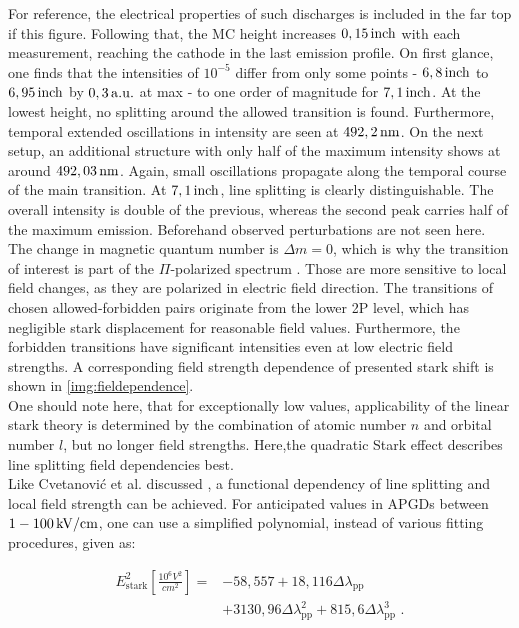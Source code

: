 \documentclass[a4paper,10pt,twoside]{article}
\newcommand{\tenpo}[1]{ 10^{#1}}
\newcommand{\ix}[1]{_\text{#1}}
\begin{document}
		For reference, the electrical properties of such discharges is included in the far top if this figure. Following that, the MC height increases $\unit[0,15]{inch}$ with each measurement, reaching the cathode in the last emission profile. On first glance, one finds that the intensities of $\tenpo{-5}$ differ from only some points - $\unit[6,8]{inch}$ to $\unit[6,95]{inch}$ by $\unit[0,3]{a.u.}$ at max - to one order of magnitude for $\unit[7,1]{inch}$. At the lowest height, no splitting around the allowed transition is found. Furthermore, temporal extended oscillations in intensity are seen at $\unit[492,2]{nm}$. On the next setup, an additional structure with only half of the maximum intensity shows at around $\unit[492,03]{nm}$. Again, small oscillations propagate along the temporal course of the main transition. At $\unit[7,1]{inch}$, line splitting is clearly distinguishable. The overall intensity is double of the previous, whereas the second peak carries half of the maximum emission. Beforehand observed perturbations are not seen here.\\
		The change in magnetic quantum number is $\Delta m=0$, which is why the transition of interest is part of the $\Pi$-polarized spectrum \cite{starkshiftmeas}. Those are more sensitive to local field changes, as they are polarized in electric field direction. The transitions of chosen allowed-forbidden pairs originate from the lower 2P level, which has negligible stark displacement for reasonable field values. Furthermore, the forbidden transitions have significant intensities even at low electric field strengths. A corresponding field strength dependence of presented stark shift is shown in \autoref{img:fieldependence}.\\
		One should note here, that for exceptionally low values, applicability of the linear stark theory is determined by the combination of atomic number $n$ and orbital number $l$, but no longer field strengths. Here,the quadratic Stark effect describes line splitting field dependencies best.\\		
		Like Cvetanovi{\'c} et al. discussed \cite{starkshiftmeas}, a functional dependency of line splitting and local field strength can be achieved. For anticipated values in APGDs between $\unit[1-100]{kV/cm}$, one can use a simplified polynomial, instead of various fitting procedures, given as:
		
			\begin{align}
				E\ix{stark}^2\left[\frac{\tenpo{6}V^2}{cm^2}\right]=&-58,557+18,116\Delta\lambda\ix{pp} \nonumber \\
				&+3130,96\Delta\lambda\ix{pp}^2+815,6\Delta\lambda\ix{pp}^3 \,\,.
			\end{align}
		
\end{document}
